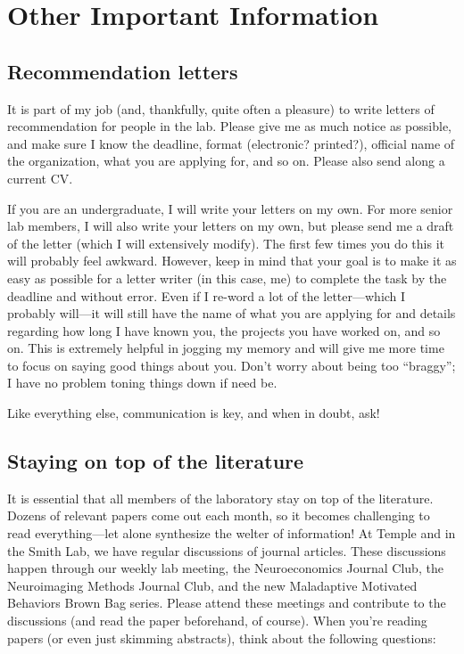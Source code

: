 \documentclass[letterpaper,12pt,oneside]{memoir}
\begin{document}
{%
\chapter{Other Important Information}
\section{Recommendation letters}
It is part of my job (and, thankfully, quite often a pleasure) to write letters of recommendation for people in the lab. Please give me as much notice as possible, and make sure I know the deadline, format (electronic? printed?), official name of the organization, what you are applying for, and so on. Please also send along a current CV.

If you are an undergraduate, I will write your letters on my own. For more senior lab members, I will also write your letters on my own, but please send me a draft of the letter (which I will extensively modify). The first few times you do this it will probably feel awkward. However, keep in mind that your goal is to make it as easy as possible for a letter writer (in this case, me) to complete the task by the deadline and without error. Even if I re-word a lot of the letter---which I probably will---it will still have the name of what you are applying for and details regarding how long I have known you, the projects you have worked on, and so on. This is extremely helpful in jogging my memory and will give me more time to focus on saying good things about you. Don't worry about being too ``braggy''; I have no problem toning things down if need be.

Like everything else, communication is key, and when in doubt, ask!

\section{Staying on top of the literature}
\label{sec:literature}

It is essential that all members of the laboratory stay on top of the literature. Dozens of relevant papers come out each month, so it becomes challenging to read everything---let alone synthesize the welter of information! At Temple and in the Smith Lab, we have regular discussions of journal articles. These discussions happen through our weekly lab meeting, the Neuroeconomics Journal Club, the Neuroimaging Methods Journal Club, and the new Maladaptive Motivated Behaviors Brown Bag series. Please attend these meetings and contribute to the discussions (and read the paper beforehand, of course). When you're reading papers (or even just skimming abstracts), think about the following questions:

}
\end{document}

